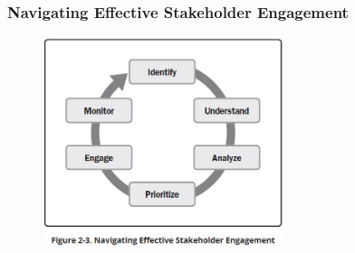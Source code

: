 \begin{frame}
	\frametitle{Navigating Effective Stakeholder Engagement}
	\begin{figure}
		\centering
		\includegraphics[width = 7cm]{../images/guide/Fig2-3.jpg}
		\label{guidefig:2-2}
	\end{figure}
\end{frame}
